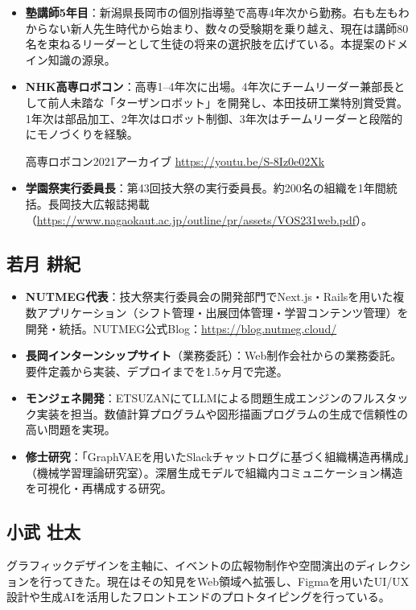 \documentclass[paper=a4,fontsize=10.5bp,jafontsize=10.5bp,twocolumn]{jlreq}
\begin{document}
\begin{itemize}
  \item \textbf{塾講師5年目}：新潟県長岡市の個別指導塾で高専4年次から勤務。右も左もわからない新人先生時代から始まり、数々の受験期を乗り越え、現在は講師80名を束ねるリーダーとして生徒の将来の選択肢を広げている。本提案のドメイン知識の源泉。
  \item \textbf{NHK高専ロボコン}：高専1--4年次に出場。4年次にチームリーダー兼部長として前人未踏な「ターザンロボット」を開発し、本田技研工業特別賞受賞。1年次は部品加工、2年次はロボット制御、3年次はチームリーダーと段階的にモノづくりを経験。

  高専ロボコン2021アーカイブ \url{https://youtu.be/S-8Iz0e02Xk}
  \item \textbf{学園祭実行委員長}：第43回技大祭の実行委員長。約200名の組織を1年間統括。長岡技大広報誌掲載（\url{https://www.nagaokaut.ac.jp/outline/pr/assets/VOS231web.pdf}）。
\end{itemize}

\subsection*{若月 耕紀}

\begin{itemize}
  \item \textbf{NUTMEG代表}：技大祭実行委員会の開発部門でNext.js・Railsを用いた複数アプリケーション（シフト管理・出展団体管理・学習コンテンツ管理）を開発・統括。NUTMEG公式Blog：\url{https://blog.nutmeg.cloud/}
  \item \textbf{長岡インターンシップサイト}（業務委託）：Web制作会社からの業務委託。要件定義から実装、デプロイまでを1.5ヶ月で完遂。
  \item \textbf{モンジェネ開発}：ETSUZANにてLLMによる問題生成エンジンのフルスタック実装を担当。数値計算プログラムや図形描画プログラムの生成で信頼性の高い問題を実現。
  \item \textbf{修士研究}：「GraphVAEを用いたSlackチャットログに基づく組織構造再構成」（機械学習理論研究室）。深層生成モデルで組織内コミュニケーション構造を可視化・再構成する研究。
\end{itemize}

\subsection*{小武 壮太}

グラフィックデザインを主軸に、イベントの広報物制作や空間演出のディレクションを行ってきた。現在はその知見をWeb領域へ拡張し、Figmaを用いたUI/UX設計や生成AIを活用したフロントエンドのプロトタイピングを行っている。
\end{document}
